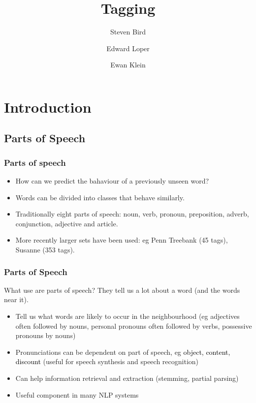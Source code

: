 \documentclass{beamer}
\title{Tagging}
\author{Steven Bird \and Edward Loper \and Ewan Klein}
\institute{
  University of Melbourne, AUSTRALIA
  \and
  University of Pennsylvania, USA
  \and
  University of Edinburgh, UK
}
\begin{document}
\frame{\titlepage}

\section{Introduction}

\subsection{Parts of Speech}

\begin{frame}
  \frametitle{Parts of speech}

  \begin{itemize}
  \item How can we predict the bahaviour of a previously unseen word?
  \item Words can be divided into classes that behave similarly.
  \item Traditionally eight parts of speech: noun, verb,
    pronoun, preposition, adverb, conjunction, adjective and article.
  \item More recently larger sets have been used: eg Penn Treebank (45
    tags), Susanne (353 tags).
  \end{itemize}
\end{frame}

\begin{frame}
  \frametitle{Parts of Speech}

  \begin{alertblock}{What use are parts of speech?}
    They tell us a lot about a word (and the words near it).
  \end{alertblock}

  \pause
  \begin{itemize}
  \item Tell us what words are likely to occur in the neighbourhood
    (eg adjectives often followed by nouns, personal pronouns often
    followed by verbs, possessive pronouns by nouns)
  \item Pronunciations can be dependent on part of speech, eg
    \textcolor{black}{object, content, discount} (useful for speech
    synthesis and speech recognition)
  \item Can help information retrieval and extraction (stemming,
    partial parsing) 
  \item Useful component in many NLP systems
  \end{itemize}
  
\end{frame}
\end{document}
